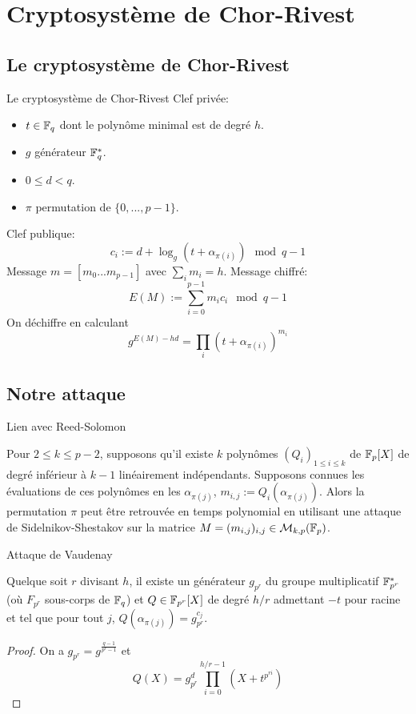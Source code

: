 \documentclass[]{beamer}
\begin{document}
\section{Cryptosystème de Chor-Rivest}


\subsection{Le cryptosystème de Chor-Rivest}
\begin{frame}{Le cryptosystème de Chor-Rivest}
Clef privée:
\begin{itemize}
\item $t \in \mathbb{F}_q$ dont le polynôme minimal est de degré $h$.
\item $g$ générateur $\mathbb{F}_q^*$.
\item $0 \leq d < q$.
\item $\pi$ permutation de $\{ 0, ... , p-1 \}$.
\end{itemize}
Clef publique:
$$ c_i := d + \log_g(t + \alpha_{\pi(i)}) \mod q-1 $$
Message $m = [m_0...m_{p-1}]$ avec $\sum_i m_i = h$.
Message chiffré:
$$ E(M) := \sum_{i=0}^{p-1} m_i c_i \mod q-1 $$
On déchiffre en calculant
$$ g^{E(M) - hd} =  \prod_i \left( t + \alpha_{\pi(i)}\right)^{m_i} $$
\end{frame}




\subsection{Notre attaque}

\begin{frame}{Lien avec Reed-Solomon}
\begin{theorem}
\label{thm:link}
Pour $2 \leq k \leq p-2$, supposons qu'il existe $k$ polynômes $(Q_i)_{1 \leq i \leq k}$ de $\mathbb{F}_p[X]$ de degré inférieur à $k-1$ linéairement indépendants. Supposons connues les évaluations de ces polynômes en les $\alpha_{\pi(j)}$, $m_{i,j} := Q_i(\alpha_{\pi(j)})$.
Alors la permutation $\pi$ peut être retrouvée en temps polynomial en utilisant une attaque de Sidelnikov-Shestakov sur la matrice $ M = (m_{i,j})_{i,j} \in \mathcal{M}_{k,p}(\mathbb{F}_p)$.
\end{theorem}
\end{frame}


\begin{frame}{Attaque de Vaudenay}
\begin{theorem}
Quelque soit  $r$ divisant $h$, il existe un générateur $g_{p^r}$ du groupe multiplicatif $\mathbb{F}_{p^r}^*$ (où $F_{p^r}$ sous-corps de $\mathbb{F}_q$) et $Q \in \mathbb{F}_{p^r}[X]$ de degré $h/r$ admettant $-t$ pour racine et tel que pour tout $j$, $Q(\alpha_{\pi(j)}) = g_{p^r}^{c_j}$.
\end{theorem}
\begin{proof}
On a $g_{p^r} = g^{\frac{q-1}{p^r-1}}$ et
$$ Q(X) = g_{p^r}^d \prod_{i=0}^{h/r-1} \left( X + t^{p^{ri}} \right) $$
\end{proof}
\end{frame}
\end{document}

